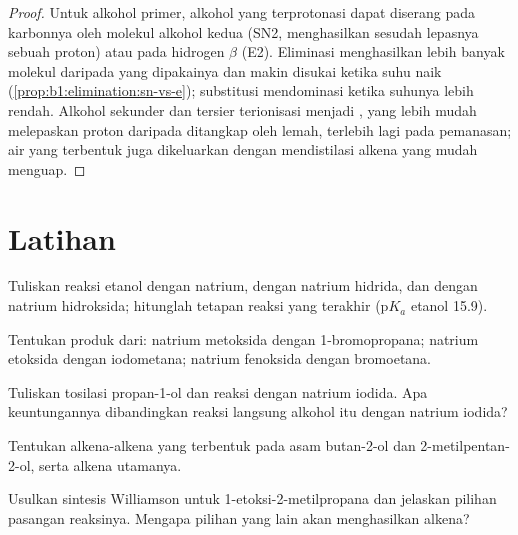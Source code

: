 \begin{proof}
Untuk alkohol primer, alkohol yang terprotonasi dapat diserang pada
karbonnya oleh molekul alkohol kedua (SN2, menghasilkan  sesudah
lepasnya sebuah proton) atau pada hidrogen $\beta$ (E2). Eliminasi
menghasilkan lebih banyak molekul daripada yang dipakainya dan makin
disukai ketika suhu naik (\cref{prop:b1:elimination:sn-vs-e}); substitusi
mendominasi ketika suhunya lebih rendah. Alkohol sekunder dan tersier
terionisasi menjadi , yang lebih mudah melepaskan proton
daripada ditangkap oleh  lemah, terlebih lagi pada pemanasan;
air yang terbentuk juga dikeluarkan dengan mendistilasi alkena yang
mudah menguap.
\end{proof}

\section{Latihan}

\begin{exercise}[$\star$]\label{exo:b1:alcohol-activation:1}
Tuliskan reaksi etanol dengan natrium, dengan natrium hidrida, dan dengan
natrium hidroksida; hitunglah tetapan reaksi yang terakhir ($\mathrm{p}K_a$
etanol 15.9).
\end{exercise}

\begin{exercise}[$\star$]\label{exo:b1:alcohol-activation:2}
Tentukan produk dari: natrium metoksida dengan 1-bromopropana; natrium
etoksida dengan iodometana; natrium fenoksida dengan bromoetana.
\end{exercise}

\begin{exercise}[$\star$]\label{exo:b1:alcohol-activation:3}
Tuliskan tosilasi propan-1-ol dan reaksi  dengan natrium
iodida. Apa keuntungannya dibandingkan reaksi langsung alkohol itu dengan
natrium iodida?
\end{exercise}

\begin{exercise}[$\star$]\label{exo:b1:alcohol-activation:4}
Tentukan alkena-alkena yang terbentuk pada  asam butan-2-ol dan
2-metilpentan-2-ol, serta alkena utamanya.
\end{exercise}

\begin{exercise}[$\star\star$]\label{exo:b1:alcohol-activation:5}
Usulkan sintesis Williamson untuk 1-etoksi-2-metilpropana dan jelaskan
pilihan pasangan reaksinya. Mengapa pilihan yang lain akan menghasilkan alkena?
\end{exercise}

